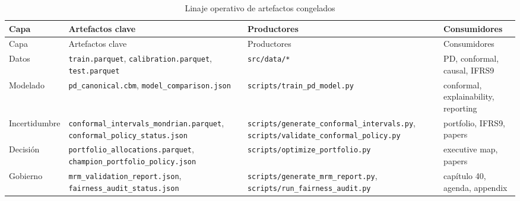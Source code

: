 \documentclass[
  spanish,
  11pt,
  letterpaper,
]{scrbook}
\theoremstyle{plain}
\theoremstyle{remark}
\begin{document}
\begin{longtable}[]{@{}
  >{\raggedright\arraybackslash}p{}
  >{\raggedright\arraybackslash}p{}
  >{\raggedright\arraybackslash}p{}
  >{\raggedright\arraybackslash}p{}@{}}
\caption{Linaje operativo de artefactos
congelados}\label{tbl-operational-lineage}\tabularnewline
\toprule\noalign{}
\begin{minipage}[b]{\linewidth}\raggedright
Capa
\end{minipage} & \begin{minipage}[b]{\linewidth}\raggedright
Artefactos clave
\end{minipage} & \begin{minipage}[b]{\linewidth}\raggedright
Productores
\end{minipage} & \begin{minipage}[b]{\linewidth}\raggedright
Consumidores
\end{minipage} \\
\midrule\noalign{}
\endfirsthead
\toprule\noalign{}
\begin{minipage}[b]{\linewidth}\raggedright
Capa
\end{minipage} & \begin{minipage}[b]{\linewidth}\raggedright
Artefactos clave
\end{minipage} & \begin{minipage}[b]{\linewidth}\raggedright
Productores
\end{minipage} & \begin{minipage}[b]{\linewidth}\raggedright
Consumidores
\end{minipage} \\
\midrule\noalign{}
\endhead
\bottomrule\noalign{}
\endlastfoot
Datos & \texttt{train.parquet}, \texttt{calibration.parquet},
\texttt{test.parquet} & \texttt{src/data/*} & PD, conformal, causal,
IFRS9 \\
Modelado & \texttt{pd\_canonical.cbm}, \texttt{model\_comparison.json} &
\texttt{scripts/train\_pd\_model.py} & conformal, explainability,
reporting \\
Incertidumbre & \texttt{conformal\_intervals\_mondrian.parquet},
\texttt{conformal\_policy\_status.json} &
\texttt{scripts/generate\_conformal\_intervals.py},
\texttt{scripts/validate\_conformal\_policy.py} & portfolio, IFRS9,
papers \\
Decisión & \texttt{portfolio\_allocations.parquet},
\texttt{champion\_portfolio\_policy.json} &
\texttt{scripts/optimize\_portfolio.py} & executive map, papers \\
Gobierno & \texttt{mrm\_validation\_report.json},
\texttt{fairness\_audit\_status.json} &
\texttt{scripts/generate\_mrm\_report.py},
\texttt{scripts/run\_fairness\_audit.py} & capítulo 40, agenda,
appendix \\
\end{longtable}
\end{document}
